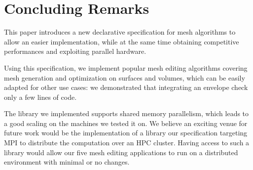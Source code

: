 \section{Concluding Remarks}

This paper introduces a new declarative specification for mesh algorithms to allow an easier implementation, while at the same time obtaining competitive performances and exploiting parallel hardware. 

Using this specification, we implement  popular mesh editing algorithms covering mesh generation and optimization on surfaces and volumes, which can be easily adapted for other use cases: we demonstrated that integrating an envelope check  only a few lines of code.

The library we implemented supports shared memory parallelism, which leads to a good scaling on the machines we tested it on. We believe an exciting venue for future work would be the implementation of a library  our specification targeting  MPI to distribute the computation over an HPC cluster. Having access to such a library would allow our five mesh editing applications to run on a distributed environment with minimal or no changes.


